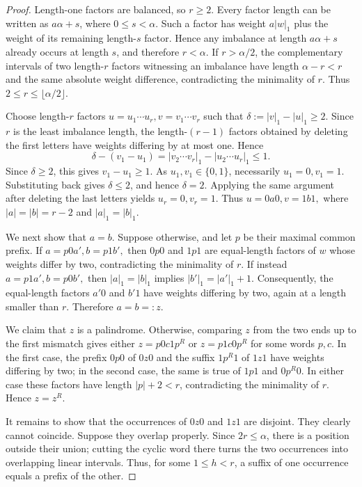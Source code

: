 \documentclass[10pt,a4paper]{amsart}
\begin{document}
\begin{proof}
Length-one factors are balanced, so $r\ge2$. Every factor length can
be written as $a\alpha+s$, where $0\le s<\alpha$. Such a factor has
weight $a|w|_1$ plus the weight of its remaining length-$s$ factor.
Hence any imbalance at length $a\alpha+s$ already occurs at length
$s$, and therefore $r<\alpha$. If $r>\alpha/2$, the complementary
intervals of two length-$r$ factors witnessing an imbalance have
length $\alpha-r<r$ and the same absolute weight difference,
contradicting the minimality of $r$. Thus
$
2\le r\le\lfloor\alpha/2\rfloor.
$

Choose length-$r$ factors
$
u=u_1\cdots u_r,$$v=v_1\cdots v_r
$
such that
$
\delta:=|v|_1-|u|_1\ge2.
$
Since $r$ is the least imbalance length, the length-$(r-1)$ factors
obtained by deleting the first letters have weights differing by at
most one. Hence
\[
\delta-(v_1-u_1)
=
|v_2\cdots v_r|_1-|u_2\cdots u_r|_1
\le1.
\]
Since $\delta\ge2$, this gives $v_1-u_1\ge1$. As
$u_1,v_1\in\{0,1\}$, necessarily
$
u_1=0,v_1=1.
$
Substituting back gives $\delta\le2$, and hence $\delta=2$.
Applying the same argument after deleting the last letters yields
$
u_r=0,v_r=1.
$
Thus
$
u=0a0, v=1b1,
$
where $|a|=|b|=r-2$ and $|a|_1=|b|_1$.

We next show that $a=b$. Suppose otherwise, and let $p$ be their
maximal common prefix. If
$
a=p0a', b=p1b',
$
then $0p0$ and $1p1$ are equal-length factors of $w$ whose weights
differ by two, contradicting the minimality of $r$. If instead
$
a=p1a', b=p0b',
$
then $|a|_1=|b|_1$ implies
$
|b'|_1=|a'|_1+1.
$
Consequently, the equal-length factors $a'0$ and $b'1$ have weights
differing by two, again at a length smaller than $r$. Therefore
$a=b=:z$.

We claim that $z$ is a palindrome. Otherwise, comparing $z$ from
the two ends up to the first mismatch gives either
$
z=p0c1p^R
$ or $
z=p1c0p^R
$
for some words $p,c$. In the first case, the prefix $0p0$ of $0z0$
and the suffix $1p^R1$ of $1z1$ have weights differing by two; in
the second case, the same is true of $1p1$ and $0p^R0$. In either
case these factors have length $|p|+2<r$, contradicting the
minimality of $r$. Hence $z=z^R$.

It remains to show that the occurrences of $0z0$ and $1z1$ are
disjoint. They clearly cannot coincide. Suppose they overlap
properly. Since $2r\le\alpha$, there is a position outside their
union; cutting the cyclic word there turns the two occurrences into
overlapping linear intervals. Thus, for some $1\le h<r$, a suffix
of one occurrence equals a prefix of the other.


\end{proof}
\end{document}
